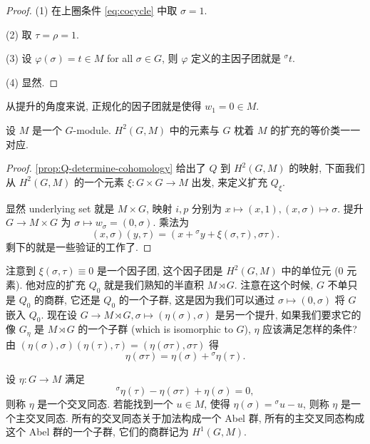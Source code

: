 \begin{proof}
(1) 在上圈条件 \cref{eq:cocycle} 中取 $\sigma = 1$.

(2) 取 $\tau = \rho = 1$.

(3) 设 $\varphi(\sigma) = t \in M$ for all $\sigma \in G$,
则 $\varphi$ 定义的主因子团就是 ${}^\sigma t$.

(4) 显然.
\end{proof}

\begin{rem*}
从提升的角度来说, 正规化的因子团就是使得 $w_1 = 0 \in M$.
\end{rem*}

\begin{thm}
设 $M$ 是一个 $G$-module.
$H^2(G, M)$ 中的元素与 $G$ 枕着 $M$ 的扩充的等价类一一对应.
\end{thm}

\begin{proof}
\cref{prop:Q-determine-cohomology} 给出了 $Q$ 到 $H^2(G, M)$ 的映射,
下面我们从 $H^2(G, M)$ 的一个元素 $\xi: G \times G \to M$ 出发, 来定义扩充 $Q_\xi$.

\bigskip

显然 underlying set 就是 $M \times G$, 映射 $i, p$ 分别为
$x \mapsto (x, 1), (x, \sigma) \mapsto \sigma$.
提升 $G \to M \times G$ 为 $\sigma \mapsto w_\sigma = (0,\sigma)$.
乘法为
\begin{equation}
(x,\sigma)(y,\tau) = (x + {}^\sigma y + \xi(\sigma,\tau), \sigma\tau).
\end{equation}
剩下的就是一些验证的工作了.
\end{proof}

\begin{exmp}[半直积]
注意到 $\xi(\sigma,\tau) \equiv 0$ 是一个因子团,
这个因子团是 $H^2(G, M)$ 中的单位元 ($0$ 元素).
他对应的扩充 $Q_0$ 就是我们熟知的半直积 $M \rtimes G$.
注意在这个时候, $G$ 不单只是 $Q_0$ 的商群, 它还是 $Q_0$ 的一个子群,
这是因为我们可以通过 $\sigma \mapsto (0,\sigma)$ 将 $G$ 嵌入 $Q_0$.
现在设 $G \to M \rtimes G, \sigma \mapsto (\eta(\sigma), \sigma)$
是另一个提升, 如果我们要求它的像 $G_\eta$ 是 $M \rtimes G$ 的一个子群
(which is isomorphic to $G$), $\eta$ 应该满足怎样的条件?
由 $(\eta(\sigma),\sigma)(\eta(\tau),\tau) = (\eta(\sigma\tau),\sigma\tau)$ 得
\[
  \eta(\sigma\tau) = \eta(\sigma) + {}^\sigma\eta(\tau).
\]
\end{exmp}

\begin{defin}[交叉同态]
设 $\eta: G \to M$ 满足
\begin{equation}
{}^\sigma\eta(\tau) - \eta(\sigma\tau) + \eta(\sigma) = 0,
\end{equation}
则称 $\eta$ 是一个交叉同态.
若能找到一个 $u \in M$, 使得 $\eta(\sigma) = {}^\sigma u - u$,
则称 $\eta$ 是一个主交叉同态.
所有的交叉同态关于加法构成一个 Abel 群,
所有的主交叉同态构成这个 Abel 群的一个子群,
它们的商群记为 $H^1(G, M)$.
\end{defin}

